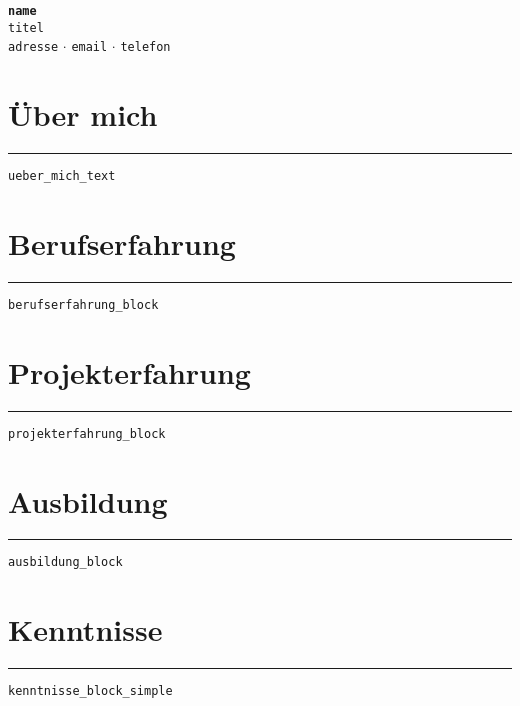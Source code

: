 \documentclass[a4paper,11pt]{article}
\newcommand{\VAR}[1]{\texttt{#1}}
\begin{document}
    \begin{center}
    {\Huge \bfseries \VAR{name}}\\[5pt]
    {\large \VAR{titel}}\\[10pt]
    \VAR{adresse} $\cdot$ \VAR{email} $\cdot$ \VAR{telefon}
    \end{center}
    \vspace{10mm}


    \section*{Über mich}
    \rule{\textwidth}{0.4pt}
    \vspace{2mm}
    \VAR{ueber_mich_text}
    \vspace{8mm}

    \section*{Berufserfahrung}
    \rule{\textwidth}{0.4pt}
    \VAR{berufserfahrung_block}

    \section*{Projekterfahrung}
    \rule{\textwidth}{0.4pt}
    \VAR{projekterfahrung_block}

    \section*{Ausbildung}
    \rule{\textwidth}{0.4pt}
    \VAR{ausbildung_block}

    \section*{Kenntnisse}
    \rule{\textwidth}{0.4pt}
    \vspace{2mm}
    \VAR{kenntnisse_block_simple}
\end{document}
